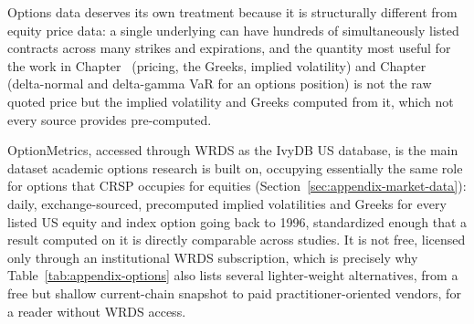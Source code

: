 \documentclass[../ai_in_finance]{subfiles}
\begin{document}
Options data deserves its own treatment because it is structurally different from equity price data: a single underlying can have hundreds of simultaneously listed contracts across many strikes and expirations, and the quantity most useful for the work in Chapter~ (pricing, the Greeks, implied volatility) and Chapter~ (delta-normal and delta-gamma VaR for an options position) is not the raw quoted price but the implied volatility and Greeks computed from it, which not every source provides pre-computed.

OptionMetrics, accessed through WRDS as the IvyDB US database, is the main dataset academic options research is built on, occupying essentially the same role for options that CRSP occupies for equities (Section~\ref{sec:appendix-market-data}): daily, exchange-sourced, precomputed implied volatilities and Greeks for every listed US equity and index option going back to 1996, standardized enough that a result computed on it is directly comparable across studies. It is not free, licensed only through an institutional WRDS subscription, which is precisely why Table~\ref{tab:appendix-options} also lists several lighter-weight alternatives, from a free but shallow current-chain snapshot to paid practitioner-oriented vendors, for a reader without WRDS access.
\end{document}
